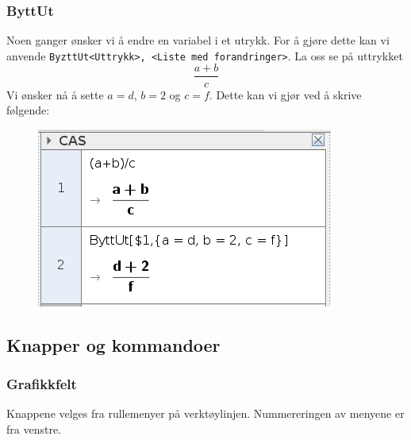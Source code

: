 \subsubsection{ByttUt}
Noen ganger ønsker vi å endre en variabel i et utrykk. For å gjøre dette kan vi anvende \texttt{{ByzttUt}{<Uttrykk>, <Liste med forandringer>}}. La oss se på uttrykket
\[ \frac{a+b}{c} \]
Vi ønsker nå å sette $ {a=d }$, $ {b=2} $ og $ {c=f} $. Dette kan vi gjør ved å skrive følgende:
\begin{figure}
	\centering
	\includegraphics[scale=0.5]{fig/cas2}
\end{figure}	
\newpage
\subsection{Knapper og kommandoer}
\subsubsection*{Grafikkfelt}
Knappene velges fra rullemenyer på verktøylinjen. Nummereringen av menyene er fra venstre.\vsk

